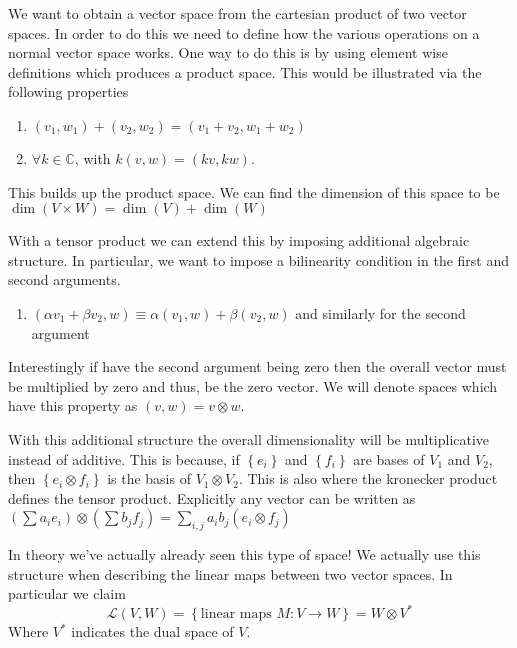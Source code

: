We want to obtain a vector space from the cartesian product of two vector spaces. In
order to do this we need to define how the various operations on a normal vector space works.
One way to do this is by using element wise definitions which produces a
{\color{red} product space}. This would be illustrated via the following properties
\begin{enumerate}
    \item $\left(v_1, w_1\right) + \left(v_2, w_2\right) = \left(v_1 + v_2, w_1 + w_2\right)$
    \item $\forall k \in \mathbb{C}$, with
        $k (v, w) = (kv, kw)$.
\end{enumerate}
This builds up the product space.
We can find the dimension of this space to be
$\dim \left(V \times W\right) = \dim(V) + \dim(W)$

With a tensor product we can extend this
by imposing additional algebraic structure. In particular,
we want to impose a bilinearity condition in the first and second arguments.
\begin{enumerate}
    \item $\left(\alpha v_1 + \beta v_2, w\right) \equiv
        \alpha \left(v_1, w\right) + \beta \left(v_2, w\right)$ and similarly
        for the second argument
\end{enumerate}
Interestingly if have the second argument being zero then the overall vector
must be multiplied by zero and thus, be the zero vector. We will denote
spaces which have this property as
$(v, w) = v \otimes w$.

With this additional structure the overall dimensionality will be multiplicative instead
of additive. This is because,
if $\left\{e_i\right\}$ and $\left\{f_i\right\}$ are bases of $V_1$ and $V_2$, then
$\left\{e_i \otimes f_i\right\}$ is the basis of $V_1 \otimes V_2$.
This is also where the kronecker product defines the tensor product. Explicitly
any vector can be written as
$\left(\sum a_i e_i\right) \otimes \left(\sum b_j f_j\right) =
\sum_{i,j} a_i b_j \left(e_i \otimes f_j\right)$

In theory we've actually already seen this type of space! We actually use this
structure when describing the linear maps between two vector spaces.
In particular we claim
$$
\mathcal{L} \left(V, W\right) = \left\{\text{linear maps }M: V \rightarrow W\right\} =
    W \otimes V^{*}
$$
Where $V^{*}$ indicates the dual space of $V$.

